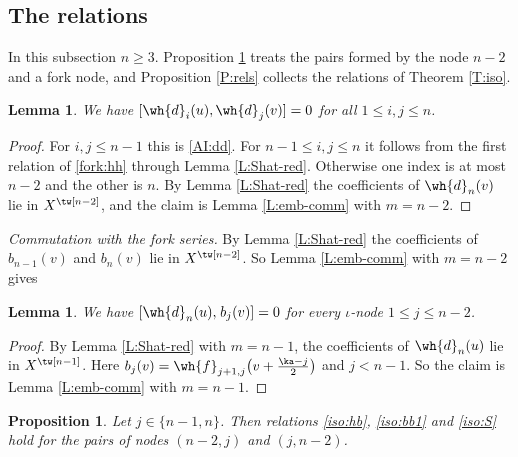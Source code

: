 \documentclass{amsart}
\newtheorem{lemma}[theorem]{Lemma}
\newtheorem{prop}[theorem]{Proposition}
\numberwithin{equation}{section}
\theoremstyle{remark}
\renewcommand{\,}{\kern 0.1em} %
\begin{document}

\subsection{The relations} \label{sec:rels}

In this subsection $n\ge3$. Proposition \ref{P:mixed} treats the pairs formed by the node $n-2$
and a fork node, and Proposition \ref{P:rels} collects the relations of Theorem \ref{T:iso}.

\begin{lemma} \label{L:dd}
%
We have $[\wh{d}_i(u),\wh{d}_j(v)] = 0$ for all $1\le i,j\le n$.
%
\end{lemma}

\begin{proof}
%
For $i,j\le n-1$ this is \eqref{AI:dd}. For $n-1\le i,j\le n$ it follows from the first relation of \eqref{fork:hh}
through Lemma \ref{L:Shat-red}. Otherwise one index is at most $n-2$ and the other is $n$.
By Lemma \ref{L:Shat-red} the coefficients of $\wh{d}_n(v)$ lie in
$X^{\tw[n-2]}$, and the claim is Lemma \ref{L:emb-comm} with $m=n-2$.
%
\end{proof}

\smallskip

{\it Commutation with the fork series.} By Lemma \ref{L:Shat-red} the coefficients of
$b_{n-1}(v)$ and $b_n(v)$ lie in $X^{\tw[n-2]}$. So Lemma \ref{L:emb-comm} with $m=n-2$ gives
%

\begin{lemma} \label{L:dn-comm}
%
We have $[\wh{d}_n(u),\, b_j(v)] = 0$ for every $\iota$-node $1\le j\le n-2$.
%
\end{lemma}

\begin{proof}
%
By Lemma \ref{L:Shat-red} with $m=n-1$, the coefficients of $\wh{d}_n(u)$
lie in $X^{\tw[n-1]}$. Here $b_j(v) = \wh{f}_{j+1,j}\big(v+\tfrac{\ka-j}{2}\big)$ and $j<n-1$. So
the claim is Lemma \ref{L:emb-comm} with $m=n-1$.
%
\end{proof}

\begin{prop} \label{P:mixed}
%
Let $j\in\{n-1,n\}$. Then relations \eqref{iso:hb}, \eqref{iso:bb1} and \eqref{iso:S} hold for the
pairs of nodes $(n-2,j)$ and $(j,n-2)$.
%
\end{prop}
\end{document}
